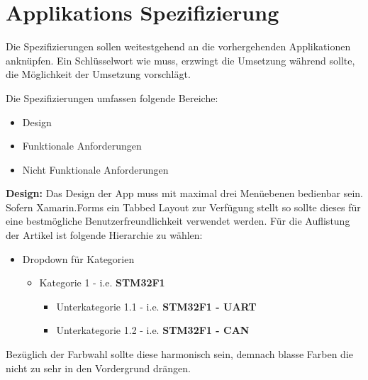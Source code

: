 	\newpage

\section{Applikations Spezifizierung}
\label{sec:mckspecs}

	Die Spezifizierungen sollen weitestgehend an die vorhergehenden Applikationen anknüpfen. Ein Schlüsselwort wie muss, erzwingt die Umsetzung während sollte, die Möglichkeit der Umsetzung vorschlägt.

	Die Spezifizierungen umfassen folgende Bereiche:
	\begin{itemize}
		\setlength\itemsep{0em}
		\item Design
		\item Funktionale Anforderungen
		\item Nicht Funktionale Anforderungen
	\end{itemize}

	\textbf{Design:} Das Design der App muss mit maximal drei Menüebenen bedienbar sein. Sofern Xamarin.Forms ein Tabbed Layout zur Verfügung stellt so sollte dieses für eine bestmögliche Benutzerfreundlichkeit verwendet werden. Für die Auflistung der Artikel ist folgende Hierarchie zu wählen:
	\begin{itemize}
		\setlength\itemsep{0em}
		\item Dropdown für Kategorien
		\begin{itemize}
			\setlength\itemsep{0em}
			\item Kategorie 1 - i.e. \textbf{STM32F1}
			\begin{itemize}
				\setlength\itemsep{0em}
				\item Unterkategorie 1.1 - i.e. \textbf{STM32F1 - UART}
				\item Unterkategorie 1.2 - i.e. \textbf{STM32F1 - CAN}
			\end{itemize}
		\end{itemize}
	\end{itemize}
	Bezüglich der Farbwahl sollte diese harmonisch sein, demnach blasse Farben die nicht zu sehr in den Vordergrund drängen.

